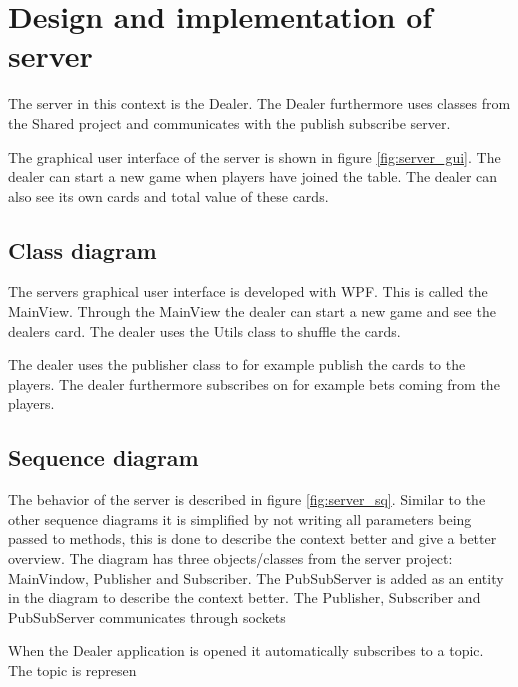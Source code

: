 \FloatBarrier

\section{Design and implementation of server}
The server in this context is the Dealer. The Dealer furthermore uses classes from the Shared project and communicates with the publish subscribe server.

The graphical user interface of the server is shown in figure \ref{fig:server_gui}. The dealer can start a new game when players have joined the table. The dealer can also see its own cards and total value of these cards.  

\FloatBarrier

\subsection{Class diagram}
The servers graphical user interface is developed with WPF. This is called the MainView. Through the MainView the dealer can start a new game and see the dealers card. The dealer uses the Utils class to shuffle the cards. 

The dealer uses the publisher class to for example publish the cards to the players. The dealer furthermore subscribes on for example bets coming from the players.

\FloatBarrier

\subsection{Sequence diagram}
The behavior of the server is described in figure \ref{fig:server_sq}. Similar to the other sequence diagrams it is simplified by not writing all parameters being passed to methods, this is done to describe the context better and give a better overview. The diagram has three objects/classes from the server project: MainVindow, Publisher and Subscriber. The PubSubServer is added as an entity in the diagram to describe the context better. The Publisher, Subscriber and PubSubServer communicates through sockets

When the Dealer application is opened it automatically subscribes to a topic. The topic is represen

\FloatBarrier
